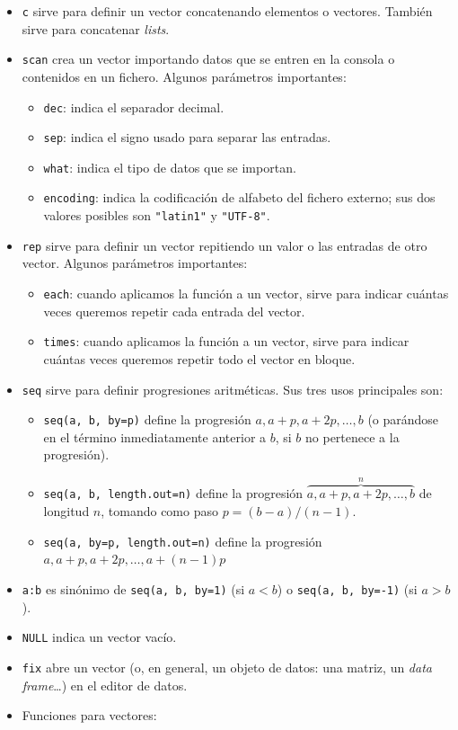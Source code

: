 \documentclass[
]{book}
\providecommand{\tightlist}{%
  \setlength{\itemsep}{0pt}\setlength{\parskip}{0pt}}
\theoremstyle{definition}
\theoremstyle{definition}
\theoremstyle{definition}
\theoremstyle{remark}
\begin{document}
\begin{itemize}
\tightlist
\item
  \texttt{c} sirve para definir un vector concatenando elementos o vectores. También sirve para concatenar \emph{lists}.
\item
  \texttt{scan} crea un vector importando datos que se entren en la consola o contenidos en un fichero. Algunos parámetros importantes:

  \begin{itemize}
  \tightlist
  \item
    \texttt{dec}: indica el separador decimal.
  \item
    \texttt{sep}: indica el signo usado para separar las entradas.
  \item
    \texttt{what}: indica el tipo de datos que se importan.
  \item
    \texttt{encoding}: indica la codificación de alfabeto del fichero externo;
    sus dos valores posibles son \texttt{"latin1"} y \texttt{"UTF-8"}.
  \end{itemize}
\item
  \texttt{rep} sirve para definir un vector repitiendo un valor o las entradas de otro vector. Algunos parámetros importantes:

  \begin{itemize}
  \tightlist
  \item
    \texttt{each}: cuando aplicamos la función a un vector, sirve para indicar cuántas veces queremos repetir cada entrada del vector.
  \item
    \texttt{times}: cuando aplicamos la función a un vector, sirve para indicar cuántas veces queremos repetir todo el vector en bloque.
  \end{itemize}
\item
  \texttt{seq} sirve para definir progresiones aritméticas. Sus tres usos principales son:

  \begin{itemize}
  \tightlist
  \item
    \texttt{seq(a,\ b,\ by=p)} define la progresión \(a, a+p, a+2p, \ldots, b\) (o parándose en el término inmediatamente anterior a \(b\), si \(b\) no pertenece a la progresión).
  \item
    \texttt{seq(a,\ b,\ length.out=n)} define la progresión \(\overbrace{a, a+p, a+2p, \ldots, b}^n\) de longitud \(n\), tomando como paso \(p=(b-a)/(n-1)\).
  \item
    \texttt{seq(a,\ by=p,\ length.out=n)} define la progresión \(a, a+p, a+2p, \ldots, a+(n-1)p\)
  \end{itemize}
\item
  \texttt{a:b} es sinónimo de \texttt{seq(a,\ b,\ by=1)} (si \(a<b\)) o \texttt{seq(a,\ b,\ by=-1)} (si \(a>b\)).
\item
  \texttt{NULL} indica un vector vacío.
\item
  \texttt{fix} abre un vector (o, en general, un objeto de datos: una matriz, un \emph{data frame}\ldots) en el editor de datos.
\item
  Funciones para vectores:


\end{itemize}
\end{document}
